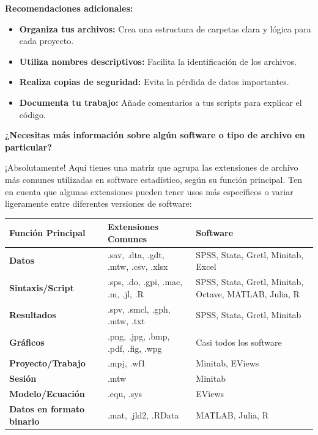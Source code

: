 \documentclass[
  stu,
  floatsintext,
  longtable,
  a4paper,
  nolmodern,
  notxfonts,
  notimes,
  12pt,
  colorlinks=true,linkcolor=blue,citecolor=blue,urlcolor=blue]{apa7}
\providecommand{\tightlist}{%
  \setlength{\itemsep}{0pt}\setlength{\parskip}{0pt}}
\newcounter{none} %
\begin{document}
\textbf{Recomendaciones adicionales:}

\begin{itemize}
\tightlist
\item
  \textbf{Organiza tus archivos:} Crea una estructura de carpetas clara
  y lógica para cada proyecto.
\item
  \textbf{Utiliza nombres descriptivos:} Facilita la identificación de
  los archivos.
\item
  \textbf{Realiza copias de seguridad:} Evita la pérdida de datos
  importantes.
\item
  \textbf{Documenta tu trabajo:} Añade comentarios a tus scripts para
  explicar el código.
\end{itemize}

\textbf{¿Necesitas más información sobre algún software o tipo de
archivo en particular?}

¡Absolutamente! Aquí tienes una matriz que agrupa las extensiones de
archivo más comunes utilizadas en software estadístico, según su función
principal. Ten en cuenta que algunas extensiones pueden tener usos más
específicos o variar ligeramente entre diferentes versiones de software:

{\def\LTcaptype{none} %
\begin{longtable}[]{@{}
  >{\raggedright\arraybackslash}p{}
  >{\raggedright\arraybackslash}p{}
  >{\raggedright\arraybackslash}p{}@{}}
\toprule\noalign{}
\begin{minipage}[b]{\linewidth}\raggedright
Función Principal
\end{minipage} & \begin{minipage}[b]{\linewidth}\raggedright
Extensiones Comunes
\end{minipage} & \begin{minipage}[b]{\linewidth}\raggedright
Software
\end{minipage} \\
\midrule\noalign{}
\endhead
\bottomrule\noalign{}
\endlastfoot
\textbf{Datos} & .sav, .dta, .gdt, .mtw, .csv, .xlsx & SPSS, Stata,
Gretl, Minitab, Excel \\
\textbf{Sintaxis/Script} & .sps, .do, .gpi, .mac, .m, .jl, .R & SPSS,
Stata, Gretl, Minitab, Octave, MATLAB, Julia, R \\
\textbf{Resultados} & .spv, .smcl, .gph, .mtw, .txt & SPSS, Stata,
Gretl, Minitab \\
\textbf{Gráficos} & .png, .jpg, .bmp, .pdf, .fig, .wpg & Casi todos los
software \\
\textbf{Proyecto/Trabajo} & .mpj, .wf1 & Minitab, EViews \\
\textbf{Sesión} & .mtw & Minitab \\
\textbf{Modelo/Ecuación} & .equ, .sys & EViews \\
\textbf{Datos en formato binario} & .mat, .jld2, .RData & MATLAB, Julia,
R \\
\end{longtable}
}
\end{document}
